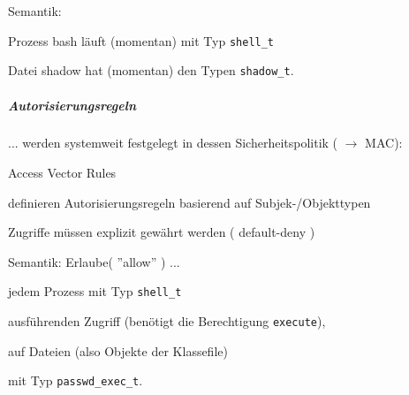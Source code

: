\documentclass[a4paper]{article}
\begin{document}
\begin{multicols}{3}

    \begin{itemize*}
        \item
        Semantik:
        \begin{itemize*}
            \item Prozess bash läuft (momentan) mit Typ \texttt{shell\_t}
            \item Datei shadow hat (momentan) den Typen \texttt{shadow\_t}.
        \end{itemize*}
    \end{itemize*}


    \subparagraph{Autorisierungsregeln}

    ... werden systemweit festgelegt in dessen Sicherheitspolitik
    ( $\rightarrow$ MAC):

    Access Vector Rules

    \begin{itemize*}
        \item
        definieren Autorisierungsregeln basierend auf Subjek-/Objekttypen
        \item
        Zugriffe müssen explizit gewährt werden ( default-deny )

        \item
        Semantik: Erlaube( ''allow'' ) ...
        \begin{itemize*}
            \item jedem Prozess mit Typ \texttt{shell\_t}
            \item ausführenden Zugriff (benötigt die Berechtigung \texttt{execute}),
            \item auf Dateien (also Objekte der Klassefile)
            \item mit Typ \texttt{passwd\_exec\_t}.
        \end{itemize*}
    \end{itemize*}



\end{multicols}
\end{document}
